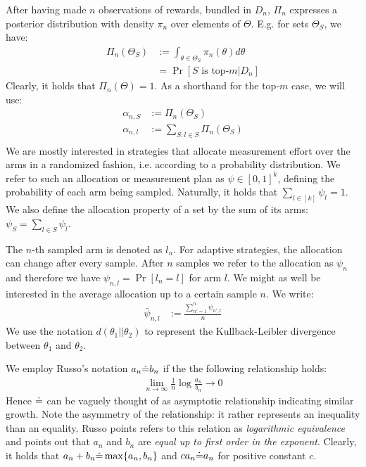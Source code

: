 After having made $n$ observations of rewards, bundled in $D_n$, $\Pi_n$
expresses a posterior distribution with density $\pi_n$ over elements of
$\Theta$. E.g. for sets $\Theta_{S}$, we have:
\begin{align}
  \Pi_n(\Theta_{S}) &:= \int_{\theta \in \Theta_{S}} \pi_n(\theta)
      d\theta \\
    &= \Pr[S \text{ is top-}m | D_n]
\end{align}
Clearly, it holds that $\Pi_n(\Theta) = 1$. As a shorthand for the top-$m$ case, we will use:
\begin{align}
  \alpha_{n, S} &:= \Pi_n(\Theta_{S}) \\
  \alpha_{n, l} &:= \sum_{S: l \in S} \Pi_n(\Theta_{S}) \\
\end{align}
We are mostly interested in strategies that allocate measurement effort over the
arms in a randomized fashion, i.e. according to a probability distribution. We
refer to such an allocation or measurement plan as $\psi \in [0, 1]^k$, defining
the probability of each arm being sampled. Naturally, it holds that $\sum_{l \in
[k]} \psi_l = 1$. We also define the allocation property of a set by the sum of
its arms: $\psi_S = \sum_{l \in S} \psi_l$.

The $n$-th sampled arm is denoted as $l_n$. For adaptive strategies, the
allocation can change after every sample. After $n$ samples we refer to the
allocation as $\psi_{n}$ and therefore we have $\psi_{n, l} = \Pr[l_n = l]$ for
arm $l$. We might as well be interested in the average allocation up to a
certain sample $n$. We write:
\begin{align}
  \bar{\psi}_{n, l} &:= \frac{\sum_{n' = 1}^{n} \psi_{n', l}}{n}
\end{align}
We use the notation $d(\theta_1||\theta_2)$ to represent the Kullback-Leibler
divergence between $\theta_1$ and $\theta_2$.

We employ Russo's notation $a_n \dot{=} b_n$ if the the following relationship
holds:
\begin{align}
  \lim_{n \rightarrow \infty}\frac{1}{n}\log{\frac{a_n}{b_n}} \rightarrow 0
\end{align}
Hence $\dot{=}$ can be vaguely thought of as asymptotic relationship indicating
similar growth. Note the asymmetry of the relationship: it rather
represents an inequality than an equality. Russo points refers to this relation as \emph{logarithmic equivalence} and points out that $a_n$ and $b_n$ are \emph{equal up to first order in the exponent}. Clearly, it holds that $a_n + b_n \dot{=} \max\{a_n, b_n\}$ and $c a_n \dot{=} a_n$ for positive constant $c$.

